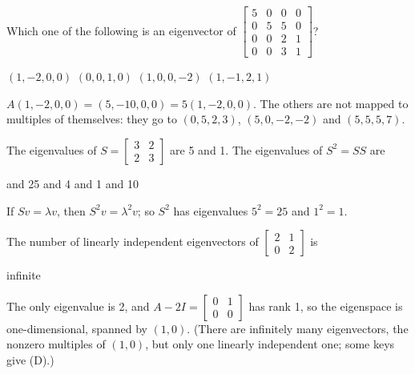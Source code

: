 \begin{question}[id=gate-me2005-2, source=GATE ME 2005, marks=2]
Which one of the following is an eigenvector of $\begin{bmatrix} 5 & 0 & 0 & 0 \\ 0 & 5 & 5 & 0 \\ 0 & 0 & 2 & 1 \\ 0 & 0 & 3 & 1 \end{bmatrix}$?
\begin{options}
  \correct $(1, -2, 0, 0)$
  \option $(0, 0, 1, 0)$
  \option $(1, 0, 0, -2)$
  \option $(1, -1, 2, 1)$
\end{options}
\begin{solution}
$A(1, -2, 0, 0) = (5, -10, 0, 0) = 5(1, -2, 0, 0)$. The others are not mapped to multiples of themselves: they go to $(0, 5, 2, 3)$, $(5, 0, -2, -2)$ and $(5, 5, 5, 7)$.
\end{solution}
\end{question}

\begin{question}[id=gate-me2006-2, source=GATE ME 2006]
The eigenvalues of $S = \begin{bmatrix} 3 & 2 \\ 2 & 3 \end{bmatrix}$ are 5 and 1. The eigenvalues of $S^2 = SS$ are
\begin{options}
   and 25
   and 4
   and 1
   and 10
\end{options}
\begin{solution}
If $Sv = \lambda v$, then $S^2v = \lambda^2 v$; so $S^2$ has eigenvalues $5^2 = 25$ and $1^2 = 1$.
\end{solution}
\end{question}

\begin{question}[id=gate-me2007-2, source=GATE ME 2007]
The number of linearly independent eigenvectors of $\begin{bmatrix} 2 & 1 \\ 0 & 2 \end{bmatrix}$ is
\begin{options}
  \option infinite
\end{options}
\begin{solution}
The only eigenvalue is 2, and $A - 2I = \begin{bmatrix} 0 & 1 \\ 0 & 0 \end{bmatrix}$ has rank 1, so the eigenspace is one-dimensional, spanned by $(1, 0)$. (There are infinitely many eigenvectors, the nonzero multiples of $(1, 0)$, but only one linearly independent one; some keys give (D).)
\end{solution}
\end{question}

